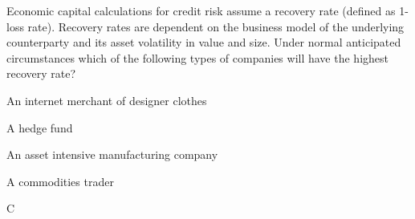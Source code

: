 \documentclass{article}
\newcounter{question} %
\begin{document}
\begin{question}
    Economic capital calculations for credit risk assume a recovery rate (defined as 1-loss rate). Recovery rates are dependent on the business model of the underlying counterparty and its asset volatility in value and size. Under normal anticipated circumstances which of the following types of companies will have the highest recovery rate?
\end{question}

\begin{choices}
    \item An internet merchant of designer clothes
    \item A hedge fund
    \item An asset intensive manufacturing company
    \item A commodities trader
\end{choices}

\begin{correctanswer}
    C
\end{correctanswer}
\end{document}
